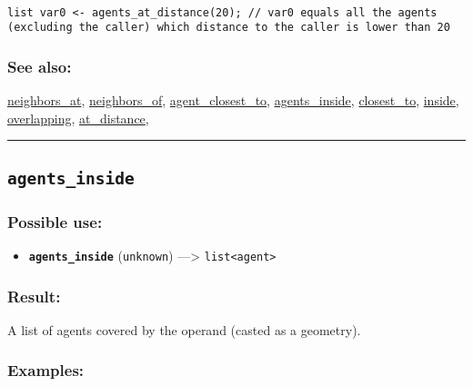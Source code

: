 \documentclass[]{book}
\providecommand{\tightlist}{%
  \setlength{\itemsep}{0pt}\setlength{\parskip}{0pt}}
\theoremstyle{definition}
\theoremstyle{definition}
\theoremstyle{definition}
\theoremstyle{remark}
\begin{document}
\begin{verbatim}
 
list var0 <- agents_at_distance(20); // var0 equals all the agents (excluding the caller) which distance to the caller is lower than 20
\end{verbatim}

\subsubsection{See also:}\label{see-also-21}

\href{OperatorsNR\#neighbors_at}{neighbors\_at},
\href{OperatorsNR\#neighbors_of}{neighbors\_of},
\href{OperatorsAA\#agent_closest_to}{agent\_closest\_to},
\href{OperatorsAA\#agents_inside}{agents\_inside},
\href{OperatorsBC\#closest_to}{closest\_to},
\href{OperatorsIM\#inside}{inside},
\href{OperatorsNR\#overlapping}{overlapping},
\href{OperatorsAA\#at_distance}{at\_distance},

\begin{center}\rule{0.5\linewidth}{\linethickness}\end{center}

\subsection{\texorpdfstring{\texttt{agents\_inside}}{agents\_inside}}\label{agents_inside}

\subsubsection{Possible use:}\label{possible-use-30}

\begin{itemize}
\tightlist
\item
  \textbf{\texttt{agents\_inside}} (\texttt{unknown}) ---\textgreater{}
  \texttt{list\textless{}agent\textgreater{}}
\end{itemize}

\subsubsection{Result:}\label{result-29}

A list of agents covered by the operand (casted as a geometry).

\subsubsection{Examples:}\label{examples-23}
\end{document}
